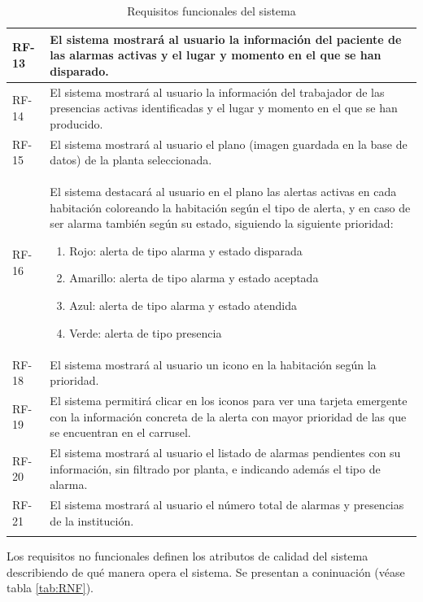\begin{longtable}{|p{1cm}|p{14cm}|}
	\hline
	RF-13	&	El sistema mostrará al usuario la información del paciente de las alarmas activas y el lugar y momento en el que se han disparado. \\
	\hline
	RF-14	&	El sistema mostrará al usuario la información del trabajador de las presencias activas identificadas y el lugar y momento en el que se han producido. \\
	\hline
	RF-15	&	El sistema mostrará al usuario el plano (imagen guardada en la base de datos) de la planta seleccionada.  \\
	\hline
	RF-16	&	El sistema destacará al usuario en el plano las alertas activas en cada habitación coloreando la habitación según el tipo de alerta, y en caso de ser alarma también según su estado, siguiendo la siguiente prioridad:
	\begin{enumerate}
		\item Rojo: alerta de tipo alarma y estado disparada
		\item Amarillo: alerta de tipo alarma y estado aceptada
		\item Azul: alerta de tipo alarma y estado atendida
		\item Verde: alerta de tipo presencia
	\end{enumerate}\\
	\hline
	RF-18	&	El sistema mostrará al usuario un icono en la habitación según la prioridad. \\
	\hline
	RF-19	&	El sistema permitirá clicar en los iconos para ver una tarjeta emergente con la información concreta de la alerta con mayor prioridad de las que se encuentran en el carrusel. \\
	\hline
	RF-20	&	El sistema mostrará al usuario el listado de alarmas pendientes con su información, sin filtrado por planta, e indicando además el tipo de alarma. \\
	\hline
	RF-21	&	El sistema mostrará al usuario el número total de alarmas y presencias de la institución. \\
	\hline
\caption{Requisitos funcionales del sistema}
\label{tab:RF}
\end{longtable}

Los requisitos no funcionales definen los atributos de calidad del sistema describiendo de qué manera opera el sistema. Se presentan a coninuación (véase tabla \ref{tab:RNF}).


